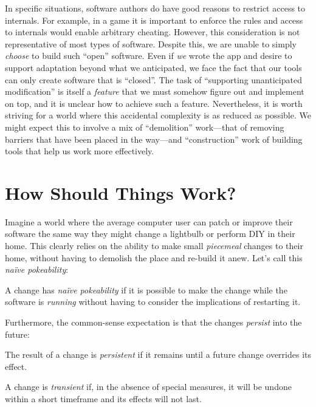 In specific situations, software authors do have good reasons to
restrict access to internals. For example, in a game it is important to
enforce the rules and access to internals would enable arbitrary
cheating. However, this consideration is not representative of most
types of software. Despite this, we are unable to simply \emph{choose}
to build such ``open'' software. Even if \emph{we} wrote the app and
desire to support adaptation beyond what we anticipated, we face the
fact that our tools can only create software that is ``closed''. The
task of ``supporting unanticipated modification'' is itself a
\emph{feature} that we must somehow figure out and implement on top, and
it is unclear how to achieve such a feature. Nevertheless, it is worth
striving for a world where this accidental complexity is as reduced as
possible. We might expect this to involve a mix of ``demolition''
work---that of removing barriers that have been placed in the way---and
``construction'' work of building tools that help us work more
effectively.

\hypertarget{how-should-things-work}{%
\section{How Should Things Work?}\label{how-should-things-work}}

Imagine a world where the average computer user can patch or improve
their software the same way they might change a lightbulb or perform DIY
in their home. This clearly relies on the ability to make small
\emph{piecemeal} changes to their home, without having to demolish the
place and re-build it anew. Let's call this \emph{naïve pokeability}:

\begin{defn}
\label{def:naive-pokeability}
A change has \emph{naïve pokeability} if it is possible to make the change while the software is \emph{running} without having to consider the implications of restarting it.
\end{defn}

Furthermore, the common-sense expectation is that the changes
\emph{persist} into the future:

\begin{defn}[Persistent]
\label{def:persistent}
The result of a change is \emph{persistent} if it remains until a future change overrides its effect.
\end{defn}

\begin{defn}[Transient]
\label{def:transient}
A change is \emph{transient} if, in the absence of special measures, it will be undone within a short timeframe and its effects will not last.
\end{defn}

